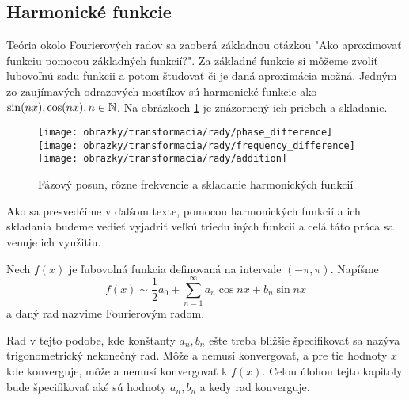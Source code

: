 \subsection{Harmonické funkcie}

Teória okolo Fourierových radov sa zaoberá základnou otázkou "Ako
aproximovať funkciu pomocou základných funkcií?".
Za základné funkcie si môžeme zvoliť ľubovoľnú sadu funkcii a potom
študovať či je daná aproximácia možná. Jedným zo zaujímavých
odrazových mostíkov sú harmonické funkcie ako $\sin(n x), \cos(nx), n
\in \mathbb{N}$.
Na obrázkoch \ref{fig:harmonic_illustration} je znázornený ich priebeh a skladanie.

\begin{figure}[htp]
    \centering
    \texttt{[image: obrazky/transformacia/rady/phase\_difference]}
    \texttt{[image: obrazky/transformacia/rady/frequency\_difference]}
    \texttt{[image: obrazky/transformacia/rady/addition]}
    \caption{Fázový posun, rôzne frekvencie a skladanie harmonických
    funkcií}\label{fig:harmonic_illustration}
\end{figure}

Ako sa presvedčíme v ďalšom texte, pomocou harmonických funkcií a ich
skladania budeme vedieť vyjadriť veľkú triedu iných funkcií a celá
táto práca sa venuje ich využitiu.

\begin{definicia} Nech $f(x)$ je ľubovoľná funkcia definovaná na
intervale $(-\pi,\pi)$. Napíšme
    \begin{equation}
        f(x) \sim \frac{1}{2} a_0 + \sum_{n=1}^{\infty} a_n
        \cos n x + b_n \sin n x
    \label{eq:trig_series}
    \end{equation}
a daný rad nazvime Fourierovým radom.
\end{definicia}

Rad v tejto podobe, kde konštanty $a_n, b_n$ ešte treba bližšie
špecifikovať sa nazýva trigonometrický nekonečný rad. Môže a nemusí
konvergovať, a pre tie hodnoty $x$ kde konverguje, môže a nemusí
konvergovať k $f(x)$. Celou úlohou tejto kapitoly bude špecifikovať
aké sú hodnoty $a_n, b_n$ a kedy rad konverguje.

